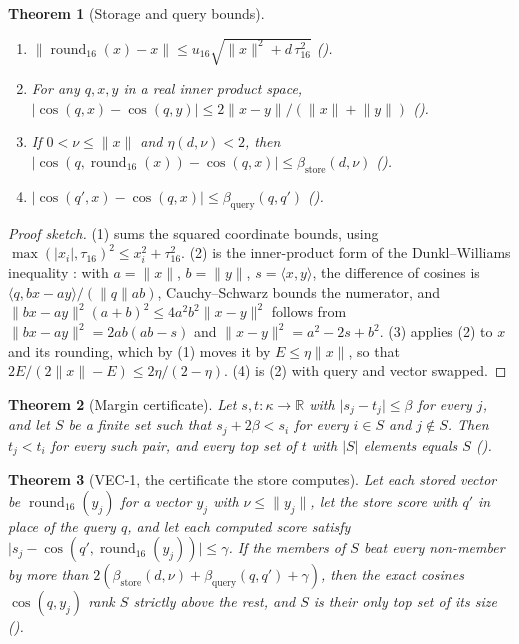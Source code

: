 \documentclass[11pt]{article}
\theoremstyle{plain}
\newtheorem{theorem}{Theorem}[section]
\theoremstyle{definition}
\theoremstyle{remark}
\newcommand{\cosine}{\operatorname{cos}}
\newcommand{\norm}[1]{\lVert #1 \rVert}
\newcommand{\abs}[1]{\lvert #1 \rvert}
\newcommand{\inner}[2]{\langle #1, #2 \rangle}
\newcommand{\betaS}{\beta_{\mathrm{store}}}
\newcommand{\betaQ}{\beta_{\mathrm{query}}}
\begin{document}
\begin{theorem}[Storage and query bounds]\label{thm:store}
\begin{enumerate}
  \item $\norm{\operatorname{round}_{16}(x) - x} \le u_{16}\sqrt{\norm{x}^2 + d\,\tau_{16}^2}$
  ().
  \item For any $q, x, y$ in a real inner product space,
  $\abs{\cosine(q, x) - \cosine(q, y)} \le 2\norm{x - y}/(\norm{x} + \norm{y})$
  ().
  \item If $0 < \nu \le \norm{x}$ and $\eta(d, \nu) < 2$, then
  $\abs{\cosine(q, \operatorname{round}_{16}(x)) - \cosine(q, x)} \le \betaS(d, \nu)$
  ().
  \item $\abs{\cosine(q', x) - \cosine(q, x)} \le \betaQ(q, q')$
  ().
\end{enumerate}
\end{theorem}

\begin{proof}[Proof sketch]
(1) sums the squared coordinate bounds, using $\max(\abs{x_i}, \tau_{16})^2 \le x_i^2 +
\tau_{16}^2$. (2) is the inner-product form of the Dunkl--Williams inequality
\citep{dunklwilliams1964}: with $a = \norm{x}$, $b = \norm{y}$, $s = \inner{x}{y}$, the
difference of cosines is $\inner{q}{b x - a y}/(\norm{q} a b)$, Cauchy--Schwarz bounds the
numerator, and $\norm{bx - ay}^2 (a + b)^2 \le 4a^2b^2\norm{x - y}^2$ follows from
$\norm{bx - ay}^2 = 2ab(ab - s)$ and $\norm{x - y}^2 = a^2 - 2s + b^2$. (3) applies (2) to $x$
and its rounding, which by (1) moves it by $E \le \eta\norm{x}$, so that
$2E/(2\norm{x} - E) \le 2\eta/(2 - \eta)$. (4) is (2) with query and vector swapped.
\end{proof}

\begin{theorem}[Margin certificate]\label{thm:margin}
Let $s, t : \kappa \to \mathbb{R}$ with $\abs{s_j - t_j} \le \beta$ for every $j$, and let $S$ be a
finite set such that $s_j + 2\beta < s_i$ for every $i \in S$ and $j \notin S$. Then
$t_j < t_i$ for every such pair, and every top set of $t$ with $\abs{S}$ elements equals $S$
().
\end{theorem}

\begin{theorem}[VEC-1, the certificate the store computes]\label{thm:vec1}
Let each stored vector be $\operatorname{round}_{16}(y_j)$ for a vector $y_j$ with
$\nu \le \norm{y_j}$, let the store score with $q'$ in place of the query $q$, and let each
computed score satisfy $\abs{s_j - \cosine(q', \operatorname{round}_{16}(y_j))} \le \gamma$. If
the members of $S$ beat every non-member by more than $2(\betaS(d, \nu) + \betaQ(q, q') +
\gamma)$, then the exact cosines $\cosine(q, y_j)$ rank $S$ strictly above the rest, and $S$ is
their only top set of its size ().
\end{theorem}
\end{document}
